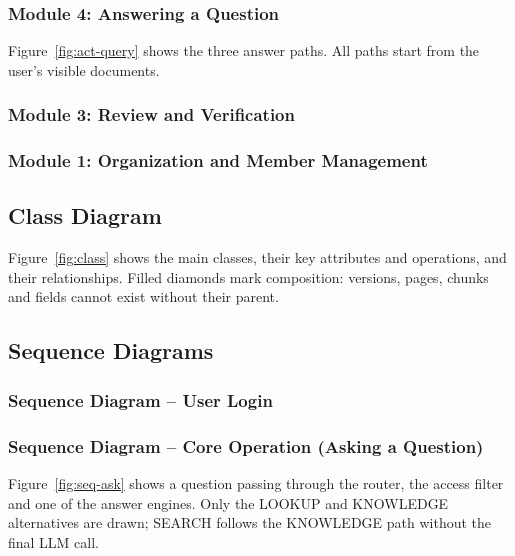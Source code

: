 
\subsubsection{Module 4: Answering a Question}
Figure~\ref{fig:act-query} shows the three answer paths. All paths start from the user's visible
documents.


\subsubsection{Module 3: Review and Verification}

\subsubsection{Module 1: Organization and Member Management}

\subsection{Class Diagram}
Figure~\ref{fig:class} shows the main classes, their key attributes and operations, and their
relationships. Filled diamonds mark composition: versions, pages, chunks and fields cannot exist without
their parent.


\subsection{Sequence Diagrams}
\subsubsection{Sequence Diagram -- User Login}

\subsubsection{Sequence Diagram -- Core Operation (Asking a Question)}
Figure~\ref{fig:seq-ask} shows a question passing through the router, the access filter and one of
the answer engines. Only the LOOKUP and KNOWLEDGE alternatives are drawn; SEARCH follows the KNOWLEDGE
path without the final LLM call.

